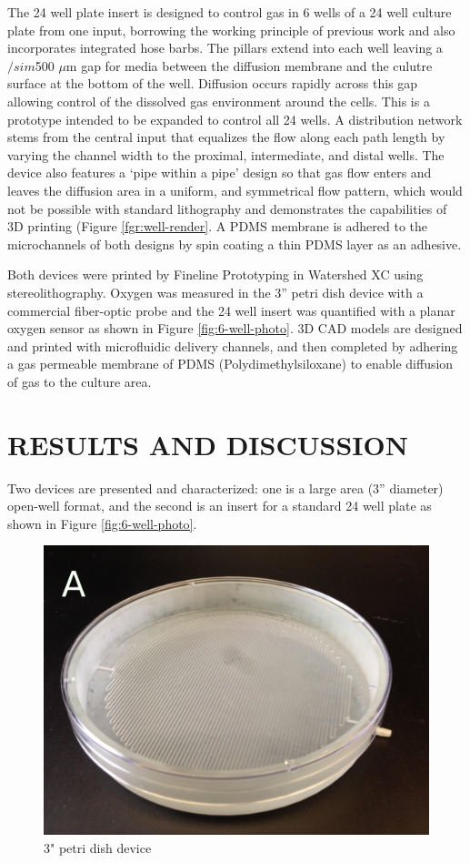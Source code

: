 \documentclass{article}
\begin{document}
The 24 well plate insert is designed to control gas in 6 wells of a 24 well culture plate from one input, borrowing the working principle of previous work\cite{Oppegard2010} and also incorporates integrated hose barbs.
The pillars extend into each well leaving a $/sim$500 $\mu$m gap for media between the diffusion membrane and the culutre surface at the bottom of the well.
Diffusion occurs rapidly across this gap allowing control of the dissolved gas environment around the cells. 
This is a prototype intended to be expanded to control all 24 wells.
A distribution network stems from the central input that equalizes the flow along each path length by varying the channel width to the proximal, intermediate, and distal wells.
The device also features a ‘pipe within a pipe’ design so that gas flow enters and leaves the diffusion area in a uniform, and symmetrical flow pattern, which would not be possible with standard lithography and demonstrates the capabilities of 3D printing (Figure \ref{fgr:well-render}.
A PDMS membrane is adhered to the microchannels of both designs by spin coating a thin PDMS layer as an adhesive.


Both devices were printed by Fineline Prototyping in Watershed XC using stereolithography.
Oxygen was measured in the 3” petri dish device with a commercial fiber-optic probe and the 24 well insert was quantified with a planar oxygen sensor as shown in Figure \ref{fig:6-well-photo}.
3D CAD models are designed and printed with microfluidic delivery channels, and then completed by adhering a gas permeable membrane of PDMS (Polydimethylsiloxane) to enable diffusion of gas to the culture area.

\section{RESULTS AND DISCUSSION}

Two devices are presented and characterized: one is a large area (3” diameter) open-well format, and the second is an insert for a standard 24 well plate as shown in Figure \ref{fig:6-well-photo}.


\begin{figure}[h!]
\centering
\includegraphics[scale=0.2]{3-inch-well-photo.png}
\caption{3" petri dish device}
\label{fig:3-inch-well-photo}
\end{figure}
\end{document}
